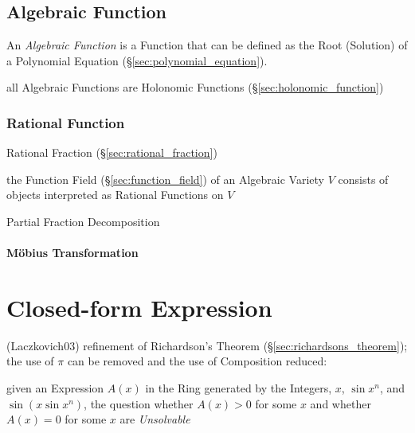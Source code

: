 \subsection{Algebraic Function}\label{sec:algebraic_function}

An \emph{Algebraic Function} is a Function that can be defined as the Root
(Solution) of a Polynomial Equation (\S\ref{sec:polynomial_equation}).

all Algebraic Functions are Holonomic Functions (\S\ref{sec:holonomic_function})



\subsubsection{Rational Function}\label{sec:rational_function}

Rational Fraction (\S\ref{sec:rational_fraction})

the Function Field (\S\ref{sec:function_field}) of an Algebraic Variety $V$
consists of objects interpreted as Rational Functions on $V$

Partial Fraction Decomposition



\paragraph{M\"obius Transformation}\label{sec:mobius_transformation}\hfill




\section{Closed-form Expression}\label{sec:closed_form_expression}

(Laczkovich03) refinement of Richardson's Theorem
(\S\ref{sec:richardsons_theorem}); the use of $\pi$ can be removed and the use
of Composition reduced:

given an Expression $A(x)$ in the Ring generated by the Integers, $x$, $\sin
x^n$, and $\sin(x \sin x^n)$, the question whether $A(x) > 0$ for some $x$ and
whether $A(x) = 0$ for some $x$ are \emph{Unsolvable}



